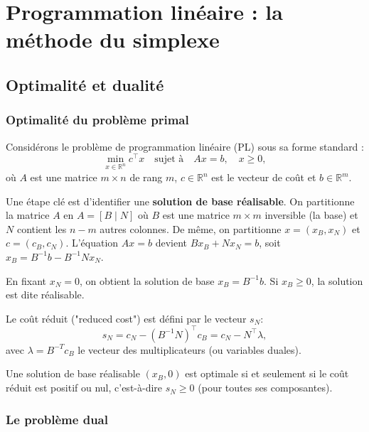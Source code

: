 \chapter{Programmation linéaire : la méthode du simplexe}
\label{chap:linear-programming}

\section{Optimalité et dualité}

\subsection{Optimalité du problème primal}

Considérons le problème de programmation linéaire (PL) sous sa forme standard :
\begin{equation}
    \min_{x \in \mathbb{R}^n} c^\top x \quad \text{sujet à} \quad Ax = b, \quad x \geq 0,
\end{equation}
où $A$ est une matrice $m \times n$ de rang $m$, $c \in \mathbb{R}^n$ est le vecteur de coût et $b \in \mathbb{R}^m$.

Une étape clé est d'identifier une \textbf{solution de base réalisable}. On partitionne la matrice $A$ en $A = [B \mid N]$ où $B$ est une matrice $m \times m$ inversible (la base) et $N$ contient les $n-m$ autres colonnes. De même, on partitionne $x = (x_B, x_N)$ et $c = (c_B, c_N)$.
L'équation $Ax=b$ devient $Bx_B + Nx_N = b$, soit $x_B = B^{-1}b - B^{-1}Nx_N$.

En fixant $x_N = 0$, on obtient la solution de base $x_B = B^{-1}b$. Si $x_B \ge 0$, la solution est dite réalisable.

Le coût réduit ("reduced cost") est défini par le vecteur $s_N$:
\begin{equation}
    s_N = c_N - (B^{-1}N)^\top c_B = c_N - N^\top \lambda,
\end{equation}
avec $\lambda = B^{-T} c_B$ le vecteur des multiplicateurs (ou variables duales).

\begin{theoreme}
    Une solution de base réalisable $(x_B, 0)$ est optimale si et seulement si le coût réduit est positif ou nul, c'est-à-dire $s_N \geq 0$ (pour toutes ses composantes).
\end{theoreme}

\subsection{Le problème dual}


